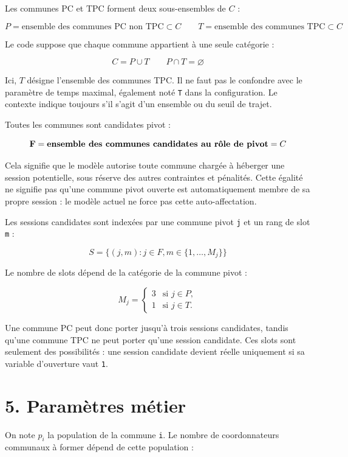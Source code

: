 \documentclass[11pt,a4paper]{article}
\begin{document}
Les communes PC et TPC forment deux sous-ensembles de $C$ :

\[
 P = \text{ensemble des communes PC non TPC} \subset C
\qquad
T = \text{ensemble des communes TPC} \subset C
\]

Le code suppose que chaque commune appartient à une seule catégorie :

\[
C = P \cup T
\qquad
P \cap T = \varnothing
\]

Ici, $T$ désigne l'ensemble des communes TPC. Il ne faut pas le confondre avec le paramètre de temps maximal, également noté \texttt{T} dans la configuration. Le contexte indique toujours s'il s'agit d'un ensemble ou du seuil de trajet.

Toutes les communes sont candidates pivot :

\[
\mathbf{F} = \text{\textbf{ensemble des communes candidates au rôle de pivot}} = C
\]


Cela signifie que le modèle autorise toute commune chargée à héberger une session potentielle, sous réserve des autres contraintes et pénalités. Cette égalité ne signifie pas qu'une commune pivot ouverte est automatiquement membre de sa propre session : le modèle actuel ne force pas cette auto-affectation.

Les sessions candidates sont indexées par une commune pivot \texttt{j} et un rang de slot \texttt{m} :

\[
S = \{(j,m) : j \in F, m \in \{1,\dots,M_j\}\}
\]

Le nombre de slots dépend de la catégorie de la commune pivot :

\[
M_j =
\begin{cases}
3 & \text{si } j \in P,\\
1 & \text{si } j \in T.
\end{cases}
\]

Une commune PC peut donc porter jusqu'à trois sessions candidates, tandis qu'une commune TPC ne peut porter qu'une session candidate. Ces slots sont seulement des possibilités : une session candidate devient réelle uniquement si sa variable d'ouverture vaut \texttt{1}.

\newpage
\section{5. Paramètres métier}

On note $p_i$ la population de la commune \texttt{i}. Le nombre de coordonnateurs communaux à former dépend de cette population :
\end{document}
